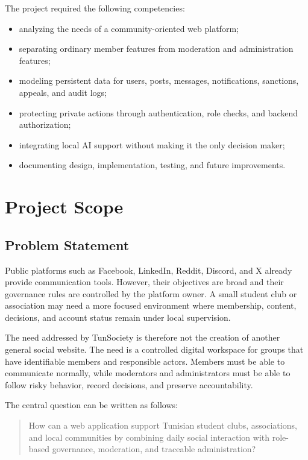 The project required the following competencies:

\begin{itemize}
    \item analyzing the needs of a community-oriented web platform;
    \item separating ordinary member features from moderation and administration features;
    \item modeling persistent data for users, posts, messages, notifications, sanctions, appeals, and audit logs;
    \item protecting private actions through authentication, role checks, and backend authorization;
    \item integrating local AI support without making it the only decision maker;
    \item documenting design, implementation, testing, and future improvements.
\end{itemize}

\section{Project Scope}

\subsection{Problem Statement}

Public platforms such as Facebook, LinkedIn, Reddit, Discord, and X already provide communication tools. However, their objectives are broad and their governance rules are controlled by the platform owner. A small student club or association may need a more focused environment where membership, content, decisions, and account status remain under local supervision.

The need addressed by TunSociety is therefore not the creation of another general social website. The need is a controlled digital workspace for groups that have identifiable members and responsible actors. Members must be able to communicate normally, while moderators and administrators must be able to follow risky behavior, record decisions, and preserve accountability.

The central question can be written as follows:

\begin{quote}
How can a web application support Tunisian student clubs, associations, and local communities by combining daily social interaction with role-based governance, moderation, and traceable administration?
\end{quote}

